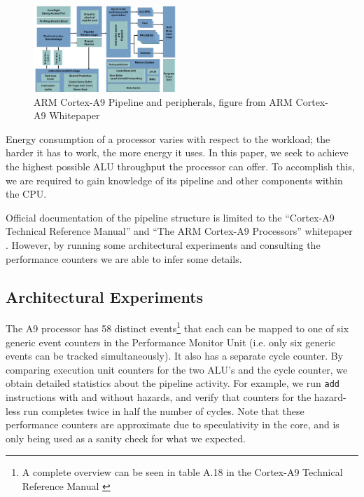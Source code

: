 \begin{figure}
    \begin{centering}
        \includegraphics[width=0.48\textwidth]{figures/A9-Pipeline-hres}
        \caption{ARM Cortex-A9 Pipeline and peripherals,\hfill
        figure from ARM Cortex-A9 Whitepaper\cite{a9whitepaper}}
        \label{fig:pipeline}
    \end{centering}
\end{figure}

Energy consumption of a processor varies with respect to the workload; the
harder it has to work, the more energy it uses. In this paper, we seek to
achieve the highest possible ALU throughput the processor can offer. To
accomplish this, we are required to gain knowledge of its pipeline and other
components within the CPU.

Official documentation of the pipeline structure is limited to the ``Cortex-A9
Technical Reference Manual'' \cite{armtech} and ``The ARM Cortex-A9 Processors''
whitepaper \cite{a9whitepaper}. However, by running some architectural
experiments and consulting the performance counters we are able to
infer some details.

\subsection{Architectural Experiments}
\label{arch_experiments}
The A9 processor has 58 distinct events\footnote{A complete overview can be seen
in table A.18 in the Cortex-A9 Technical Reference Manual \cite{armtech}} that
each can be mapped to one of six generic event counters in the Performance
Monitor Unit (i.e. only six generic events can be tracked simultaneously). It
also has a separate cycle counter. By comparing execution unit counters for the
two ALU's and the cycle counter, we obtain detailed statistics about the
pipeline activity. For example, we run \texttt{add} instructions with and
without hazards, and verify that counters for the hazard-less run completes
twice in half the number of cycles. Note that these performance counters are
approximate due to speculativity in the core, and is only being used as a sanity
check for what we expected.

